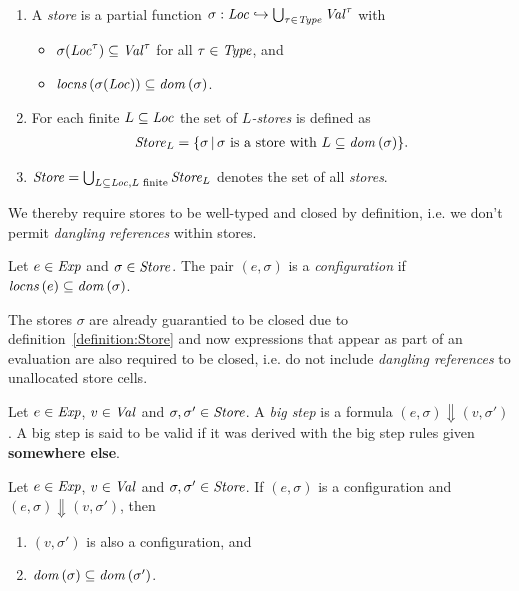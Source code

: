 \documentclass[12pt,a4paper]{report}
\begin{document}
\begin{definition}[Store] \label{definition:Store} \
  \begin{enumerate}
    \item A {\em store} is a partial function $\sigma:\mathit{Loc} \hookrightarrow \bigcup_{\tau\in\mathit{Type}} \mathit{Val}^\tau$ with
          \begin{itemize}
            \item $\sigma(\mathit{Loc}^\tau) \subseteq \mathit{Val}^\tau$ for all $\tau \in \mathit{Type}$, and
            \item $\mathit{locns}\,(\sigma(\mathit{Loc})) \subseteq \mathit{dom}\,(\sigma)$.
          \end{itemize}

    \item For each finite $L \subseteq \mathit{Loc}$ the set of {\em $L$-stores} is defined as
          \[\begin{array}{l}
            \mathit{Store}_L = \{\sigma\,|\,\text{$\sigma$ is a store with $L\subseteq\mathit{dom}\,(\sigma)$}\}.
          \end{array}\]

    \item $\mathit{Store} = \bigcup_{L\subseteq\mathit{Loc},L\text{ finite}} \mathit{Store}_L$ denotes the set of all {\em stores}.
  \end{enumerate}
\end{definition}

We thereby require stores to be well-typed and closed by definition, i.e. we don't permit {\em dangling
references} within stores.

\begin{definition}[Configuration]
  Let $e\in\mathit{Exp}$ and $\sigma\in\mathit{Store}$. The pair $(e,\sigma)$ is a {\em configuration}
  if $\mathit{locns}\,(e) \subseteq \mathit{dom}\,(\sigma)$.
\end{definition}

The stores $\sigma$ are already guarantied to be closed due to definition~\ref{definition:Store} and
now expressions that appear as part of an evaluation are also required to be closed, i.e. do not
include {\em dangling references} to unallocated store cells.

\begin{definition}
  Let $e\in\mathit{Exp}$, $v\in\mathit{Val}$ and $\sigma,\sigma'\in\mathit{Store}$. A {\em big step} is a formula
  $(e,\sigma) \Downarrow (v,\sigma')$. A big step is said to be valid if it was derived with the
  big step rules given {\bf somewhere else}.
\end{definition}

\begin{corollary}
  Let $e\in\mathit{Exp}$, $v\in\mathit{Val}$ and $\sigma,\sigma'\in\mathit{Store}$. If $(e,\sigma)$ is a configuration
  and $(e,\sigma) \Downarrow (v,\sigma')$, then
  \begin{enumerate}
    \item $(v,\sigma')$ is also a configuration, and
    \item $\mathit{dom}\,(\sigma) \subseteq \mathit{dom}\,(\sigma')$.
  \end{enumerate}
\end{corollary}
\end{document}

